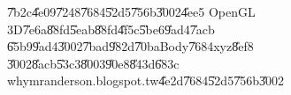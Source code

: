 \begin{figure}[th]
\caption{\U{7b2c}\U{4e09}\U{7248}\U{7684}\U{52d5}\U{756b}\U{3002}\U{4ee5}%
OpenGL 3D\U{7e6a}\U{88fd}\U{5eab}\U{88fd}\U{4f5c}\U{5be6}\U{9ad4}\U{7acb}%
\U{65b9}\U{9ad4}\U{3002}\U{7bad}\U{982d}\U{70ba}Body\U{7684}xyz\U{8ef8}%
\U{3002}\U{8acb}\U{53c3}\U{8003}\U{90e8}\U{843d}\U{683c}%
whymranderson.blogspot.tw\U{4e2d}\U{7684}\U{52d5}\U{756b}\U{3002}}
\begin{center}
\end{center}
\end{figure}

%
